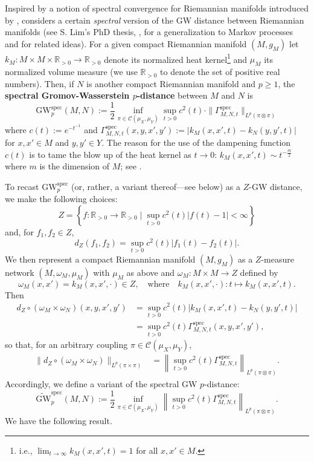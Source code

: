 \documentclass[twoside,11pt]{article}
\theoremstyle{definition}
\newcommand{\dgw}{\mathrm{GW}_p}
\newcommand{\R}{\mathbb{R}}
\newcommand{\define}[1]{\textbf{#1}}
\begin{document}
Inspired by a notion of spectral convergence for Riemannian manifolds introduced by \citet{kasue1994spectral}, \citet{memoli2009spectral,memoli2011spectral} considers a certain \emph{spectral} version of the GW distance between Riemannian manifolds (see S. Lim's PhD thesis, \citealt[Chapter 5]{thesis-sunhyuk}, for a generalization to Markov processes and \citealt{chen2022weisfeiler,chen2023weisfeiler} for related ideas). For a given compact Riemannian manifold $(M,g_M)$ let $k_M:M\times M\times \R_{>0}\to \R_{>0}$ denote its normalized heat kernel\footnote{i.e., $\lim_{t\to\infty}k_M(x,x',t) = 1$ for all $x,x'\in M$.} and $\mu_M$ its normalized volume measure (we use $\R_{>0}$ to denote the set of positive real numbers). Then, if $N$ is another compact Riemannian manifold and $p\geq 1$, the \define{spectral Gromov-Wasserstein $p$-distance} between $M$ and $N$ is
\[
\dgw^\mathrm{spec}(M,N):=\frac{1}{2} \inf_{\pi\in\mathcal{C}(\mu_X,\mu_Y)}\sup_{t>0} c^2(t)\cdot\|\Gamma_{M,N,t}^\mathrm{spec}\|_{L^p(\pi\otimes \pi)}
\]
where $c(t):=e^{-t^{-1}}$ and 
$\Gamma_{M,N,t}^\mathrm{spec}(x,y,x',y'):=\big|k_M(x,x',t)-k_N(y,y',t)\big|$ for $x,x'\in M$ and $y,y'\in Y$.
The reason for the use of the dampening function $c(t)$ is to tame the blow up of the heat kernel as $t\to 0$:  $k_M(x,x',t)\sim t^{-\tfrac{m}{2}}$  where $m$ is the dimension of $M$; see  \citep{rosenberg1997laplacian}. 

To recast $\dgw^\mathrm{spec}$ (or, rather, a variant thereof---see below) as a $Z$-GW distance, we make the following choices: 
\begin{equation}\label{eqn:specGWspace}
Z = \left\{f:\R_{>0}\to\R_{>0}\mid\sup_{t>0} c^{2}(t)|f(t)-1|<\infty\right\}
\end{equation}
and, for $f_1,f_2\in Z$,
\begin{equation}\label{eqn:specGWdistance}
d_Z(f_1,f_2)=\sup_{t>0}c^{2}(t)\big|f_1(t)-f_2(t)\big|.
\end{equation}
We then represent a compact Riemannian manifold $(M,g_M)$ as a $Z$-measure network $(M,\omega_M,\mu_M)$ with $\mu_M$ as above and $\omega_M:M \times M \to Z$ defined by
\[
\omega_M(x,x') = k_M(x,x',\cdot) \in Z, \quad \mbox{where} \quad  k_M(x,x',\cdot):t \mapsto k_M(x,x',t).
\]
Then
\begin{align} 
d_Z \circ (\omega_M \times \omega_N) (x,y,x',y') &= \sup_{t>0}c^{2}(t)\big|k_M(x,x',t)-k_N(y,y',t)\big| \\
&= \sup_{t > 0} c^2(t) \Gamma^{\mathrm{spec}}_{M,N,t}(x,y,x',y'),
\end{align}
so that, for an arbitrary coupling $\pi \in \mathcal{C}(\mu_X,\mu_Y)$,
\begin{align}
     \|d_Z \circ (\omega_M \times \omega_N)\|_{L^p(\pi \times \pi)} 
    &=  \left\| \sup_{t > 0} c^2(t) \Gamma^{\mathrm{spec}}_{M,N,t}\right\|_{L^p(\pi \otimes \pi)}.
\end{align}
Accordingly, we define a variant of the spectral GW $p$-distance:
\[
\widetilde{\mathrm{GW}}_p^\mathrm{spec}(M,N) := \frac{1}{2} \inf_{\pi \in \mathcal{C}(\mu_X,\mu_Y)} \left\| \sup_{t > 0} c^2(t) \Gamma^{\mathrm{spec}}_{M,N,t}\right\|_{L^p(\pi \otimes \pi)}.
\]
We have the following result.
\end{document}
